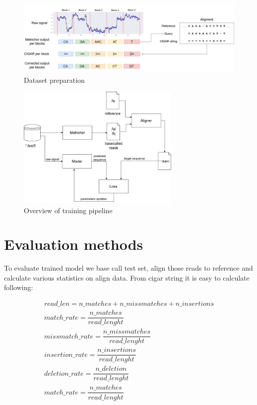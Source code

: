 \documentclass[times, utf8, diplomski, numeric, english]{fer}
\begin{document}
\begin{figure}[!ht]
	\begin{center}
		\includegraphics[width=1\textwidth]{./imgs/train_data_correction.png}
		\caption{Dataset preparation}
		\label{fg:data_correction}
	\end{center}
\end{figure}
\begin{figure}[!ht]
	\begin{center}
		\includegraphics[width=0.7\textwidth]{./imgs/train_pipeline.png}
		\caption{Overview of training pipeline}
		\label{fg:train_pipe}
	\end{center}
\end{figure}
\section{Evaluation methods}
To evaluate trained model we base call test set, align those reads to reference and calculate various statistics on align data.
From cigar string it is easy to calculate following:

\begin{gather*}
read\_len =  n\_matches + n\_missmatches + n\_insertions \\
match\_rate = \dfrac{n\_matches}{read\_lenght} \\
missmatch\_rate = \dfrac{n\_missmatches}{read\_lenght}\\
insertion\_rate = \dfrac{n\_insertions}{read\_lenght}\\
deletion\_rate = \dfrac{n\_deletion}{read\_lenght}\\
match\_rate = \dfrac{n\_matches}{read\_lenght}\\
\end{gather*}
\end{document}

